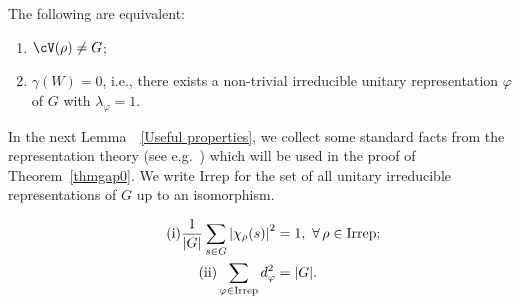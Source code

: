 \begin{theo}\label{thmgap0}
The following are equivalent:
\begin{enumerate}\romanenumi
\item \label{list6.4.1}$\cV(\rho)\not=G$;
\item \label{list6.4.2}$\gamma(W) = 0$, i.e., there exists a non-trivial irreducible unitary representation $\varphi$ of $G$ with $\lambda_\varphi =1$.
\end{enumerate}
\end{theo}

In the next Lemma~~\ref{Useful properties}, we collect some standard facts from the representation theory (see e.g.~\cite[Chapter~2]{Diaconis}) which will be used in the proof of Theorem~\ref{thmgap0}. We write $\text{Irrep}$ for the set of all unitary irreducible representations of $G$ up to an isomorphism.

\begin{lemm}\label{Useful properties}
\begin{align}
\tag{i} \frac{1}{| G |}\sum_{s\in G} \left| \chi_\rho(s) \right|^2 &= 1,~\forall\,\rho \in \textup{Irrep};\label{list6.5.1}\\
\tag{ii} \sum_{\varphi\in \textup{Irrep}} d_\varphi^2 &= | G |\label{list6.5.2}.
\end{align}
\end{lemm}



